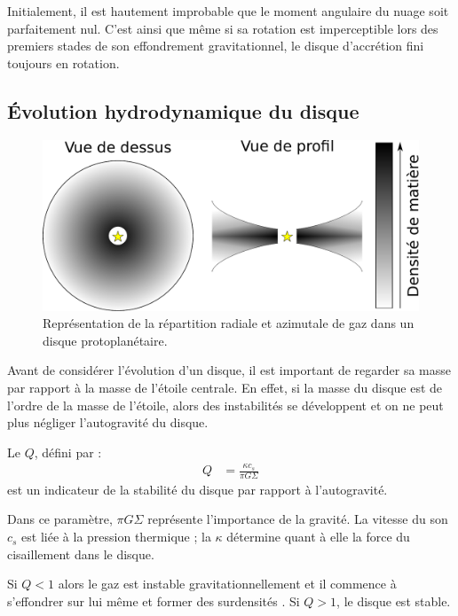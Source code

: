 Initialement, il est hautement improbable que le moment angulaire du nuage soit parfaitement nul. C'est ainsi que même si sa rotation est imperceptible lors des premiers stades de son effondrement gravitationnel, le disque d'accrétion fini toujours en rotation. 

\subsection{Évolution hydrodynamique du disque}
\begin{figure}[htb]
\centering
\includegraphics[width=0.6\linewidth]{figure/disk_scheme.pdf}
\caption{Représentation de la répartition radiale et azimutale de gaz dans un disque protoplanétaire.}\label{fig:disk_scheme}
\end{figure}

Avant de considérer l'évolution d'un disque, il est important de regarder sa masse par rapport à la masse de l'étoile centrale. En effet, si la masse du disque est de l'ordre de la masse de l'étoile, alors des instabilités se développent et on ne peut plus négliger l'autogravité du disque. 

Le  $Q$, défini par \citep{toomre1964gravitational, goldreich1965gravitational}:
\begin{align}
Q &= \frac{\kappa c_{s}}{\pi G \Sigma}
\end{align}
est un indicateur de la stabilité du disque par rapport à l'autogravité.

Dans ce paramètre, $\pi G \Sigma$ représente l'importance de la gravité. La vitesse du son $c_{s}$ est liée à la pression thermique ; la  $\kappa$ détermine quant à elle la force du cisaillement dans le disque.

\bigskip

Si $Q<1$ alors le gaz est instable gravitationnellement et il commence à s'effondrer sur lui même et former des surdensités \citep{gammie2001nonlinear}.
Si $Q>1$, le disque est stable.

